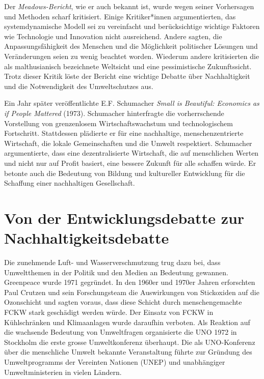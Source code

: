 \documentclass[
  nswissgerman,
  a4paper,
  openany]{book}
\begin{document}
Der \emph{Meadows-Bericht}, wie er auch bekannt ist, wurde wegen seiner
Vorhersagen und Methoden scharf kritisiert. Einige Kritiker*innen
argumentierten, das systemdynamische Modell sei zu vereinfacht und
berücksichtige wichtige Faktoren wie Technologie und Innovation nicht
ausreichend. Andere sagten, die Anpassungsfähigkeit des Menschen und die
Möglichkeit politischer Lösungen und Veränderungen seien zu wenig
beachtet worden. Wiederum andere kritisierten die als malthusianisch
bezeichnete Weltsicht und eine pessimistische Zukunftssicht. Trotz
dieser Kritik löste der Bericht eine wichtige Debatte über
Nachhaltigkeit und die Notwendigkeit des Umweltschutzes aus.

Ein Jahr später veröffentlichte E.F. Schumacher \emph{Small is
Beautiful: Economics as if People Mattered} (1973). Schumacher
hinterfragte die vorherrschende Vorstellung von grenzenlosem
Wirtschaftswachstum und technologischem Fortschritt. Stattdessen
plädierte er für eine nachhaltige, menschenzentrierte Wirtschaft, die
lokale Gemeinschaften und die Umwelt respektiert. Schumacher
argumentierte, dass eine dezentralisierte Wirtschaft, die auf
menschlichen Werten und nicht nur auf Profit basiert, eine bessere
Zukunft für alle schaffen würde. Er betonte auch die Bedeutung von
Bildung und kultureller Entwicklung für die Schaffung einer nachhaltigen
Gesellschaft.

\section{Von der Entwicklungsdebatte zur
Nachhaltigkeitsdebatte}\label{von-der-entwicklungsdebatte-zur-nachhaltigkeitsdebatte}

Die zunehmende Luft- und Wasserverschmutzung trug dazu bei, dass
Umweltthemen in der Politik und den Medien an Bedeutung gewannen.
Greenpeace wurde 1971 gegründet. In den 1960er und 1970er Jahren
erforschten Paul Crutzen und sein Forschungsteam die Auswirkungen von
Stickoxiden auf die Ozonschicht und sagten voraus, dass diese Schicht
durch menschengemachte FCKW stark geschädigt werden würde. Der Einsatz
von FCKW in Kühlschränken und Klimaanlagen wurde daraufhin verboten. Als
Reaktion auf die wachsende Bedeutung von Umweltfragen organisierte die
UNO 1972 in Stockholm die erste grosse Umweltkonferenz überhaupt. Die
als UNO-Konferenz über die menschliche Umwelt bekannte Veranstaltung
führte zur Gründung des Umweltprogramms der Vereinten Nationen (UNEP)
und unabhängiger Umweltministerien in vielen Ländern.
\end{document}
